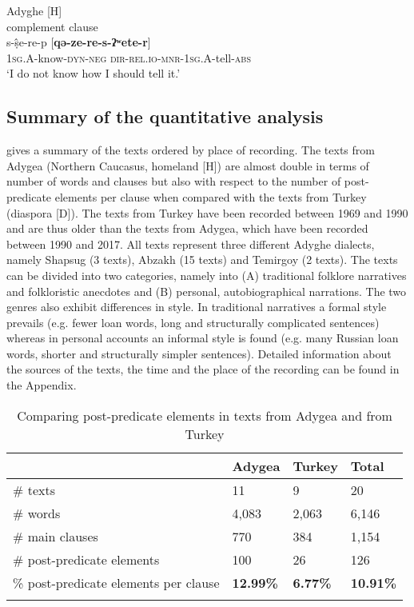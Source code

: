\documentclass[output=paper,colorlinks,citecolor=brown, draft]{langscibook}
\begin{document}
\ea\label{Adyghe:ex:45}
Adyghe \citep[251]{hohlig1997kontaktbedingter} [H] \\
complement clause \\
\gll s-ṣ̂e-re-p [\textbf{qə-ze-re-s-ʔʷete-r}] \\
\textsc{1sg.A}-know\textsc{-dyn}\textsc{-neg} \textsc{dir-}\textsc{rel.}\textsc{io-mnr-}\textsc{1sg.A}-tell\textsc{-abs} \\
\glt `I do not know how I should tell it.' 
\z


\subsection{Summary of the quantitative analysis}\label{Adyghe:ss:3.2}

 gives a summary of the texts ordered by place of recording. The texts from Adygea (Northern Caucasus, homeland [H]) are almost double in terms of number of words and clauses but also with respect to the number of post-predicate elements per clause when compared with the texts from Turkey (diaspora [D]). The texts from Turkey have been recorded between 1969 and 1990 and are thus older than the texts from Adygea, which have been recorded between 1990 and 2017. All texts represent three different Adyghe dialects, namely Shapsug (3 texts), Abzakh (15 texts) and Temirgoy (2 texts). The texts can be divided into two categories, namely into (A) traditional folklore narratives and folkloristic anecdotes and (B) personal, autobiographical narrations. The two genres also exhibit differences in style. In traditional narratives a formal style prevails (e.g. fewer loan words, long and structurally complicated sentences) whereas in personal accounts an informal style is found (e.g. many Russian loan words, shorter and structurally simpler sentences). Detailed information about the sources of the texts, the time and the place of the recording can be found in the Appendix.

\begin{table}
 \begin{tabularx}{\textwidth}{lYYY}
\lsptoprule
 & Adygea & Turkey & Total \\
\midrule
\# texts & 11 & 9 & 20 \\
\# words & 4,083 & 2,063 & 6,146 \\
\# main clauses & 770 & 384 & 1,154 \\
\# post-predicate elements & 100 & 26 & 126 \\
\% post-predicate elements per clause & \textbf{12.99\%} & \textbf{6.77\%} & \textbf{10.91\%} \\
\lspbottomrule
 \end{tabularx}
 \caption{Comparing post-predicate elements in texts from Adygea and from Turkey}
 \label{Adyghe:tab:2}
\end{table}
\end{document}
